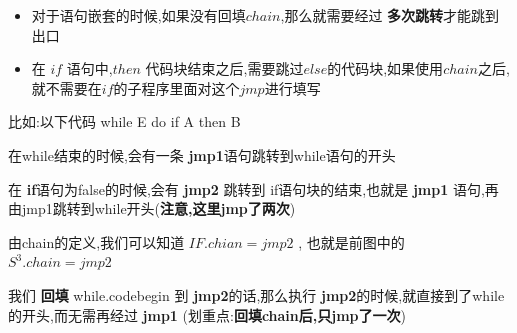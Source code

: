 \documentclass[UTF8,a4paper]{ctexart}
\begin{document}
\begin{itemize}
  \item 对于语句嵌套的时候,如果没有回填$chain$,那么就需要经过 \textbf{多次跳转}才能跳到出口
  \item 在 $if$ 语句中,$then$ 代码块结束之后,需要跳过$else$的代码块,如果使用$chain$之后,就不需要在$if$的子程序里面对这个$jmp$进行填写
\end{itemize}


比如:以下代码
while E do
\quad if A then B

在while结束的时候,会有一条 \textbf{jmp1}语句跳转到while语句的开头

在 \textbf{if}语句为false的时候,会有 \textbf{jmp2} 跳转到 if语句块的结束,也就是 \textbf{jmp1} 语句,再由jmp1跳转到while开头(\textbf{注意,这里jmp了两次})

由chain的定义,我们可以知道 \textbf{$IF.chian = jmp2$} , 也就是前图中的 \textbf{$S^3.chain = jmp2$}

我们 \textbf{回填} while.codebegin 到 \textbf{jmp2}的话,那么执行 \textbf{jmp2}的时候,就直接到了while 的开头,而无需再经过 \textbf{jmp1} (划重点:\textbf{回填chain后,只jmp了一次})
\end{document}
